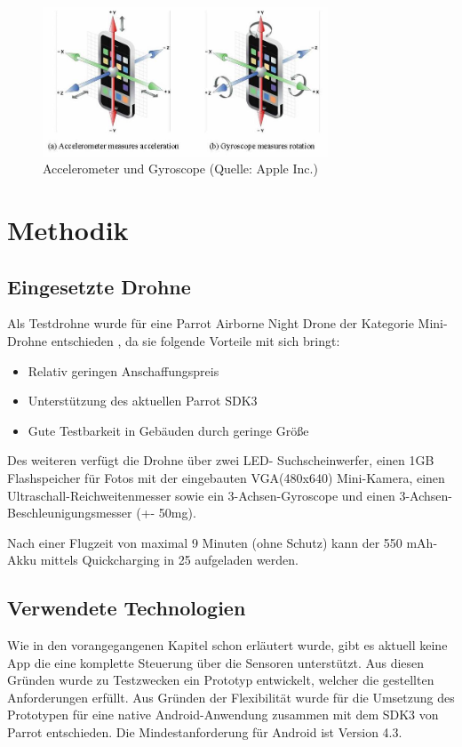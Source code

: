 \documentclass{article}
\begin{document}
\begin{figure}
\begin{minipage}[b]{1.0\linewidth}
  \centering
\centerline{\includegraphics[width= 85mm]{gyro.jpg}}
\end{minipage}
\caption{Accelerometer und Gyroscope (Quelle: Apple Inc.)}
\label{fig:gyro}
\end{figure}

\section{Methodik}

\subsection{Eingesetzte Drohne}
Als Testdrohne wurde für eine Parrot Airborne Night Drone der Kategorie Mini-Drohne entschieden \cite{minidrone}, da sie folgende Vorteile mit sich bringt: 
\begin{itemize}
	\item Relativ geringen Anschaffungspreis
	\item Unterstützung des aktuellen Parrot SDK3
	\item Gute Testbarkeit in Gebäuden durch geringe Größe 
\end{itemize}

Des weiteren verfügt die Drohne über zwei LED- Suchscheinwerfer, einen 1GB Flashspeicher für Fotos mit der eingebauten VGA(480x640) Mini-Kamera, einen Ultraschall-Reichweitenmesser sowie ein 3-Achsen-Gyroscope und einen 3-Achsen- Beschleunigungsmesser (+\/- 50mg).

Nach einer Flugzeit von maximal 9 Minuten (ohne Schutz) kann der 550 mAh-Akku mittels Quickcharging in 25 aufgeladen werden. 

\subsection{Verwendete Technologien}
Wie in den vorangegangenen Kapitel schon erläutert wurde, gibt es aktuell keine App die eine komplette Steuerung über die Sensoren unterstützt. Aus diesen Gründen wurde zu Testzwecken ein Prototyp entwickelt, welcher die gestellten Anforderungen erfüllt. Aus Gründen der Flexibilität wurde für die Umsetzung des Prototypen für eine native Android-Anwendung zusammen mit dem SDK3 von Parrot entschieden. Die Mindestanforderung für Android ist Version 4.3.\\ 
\end{document}
